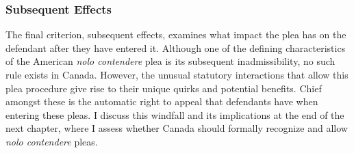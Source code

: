 \subsubsection{Subsequent Effects}

The final criterion, subsequent effects, examines what impact the plea has on the defendant after they have entered it. Although one of the defining characteristics of the American \textit{nolo contendere} plea is its subsequent inadmissibility, no such rule exists in Canada. However, the unusual statutory interactions that allow this plea procedure give rise to their unique quirks and potential benefits. Chief amongst these is the automatic right to appeal that defendants have when entering these pleas. I discuss this windfall and its implications at the end of the next chapter, where I assess whether Canada should formally recognize and allow \textit{nolo contendere} pleas.